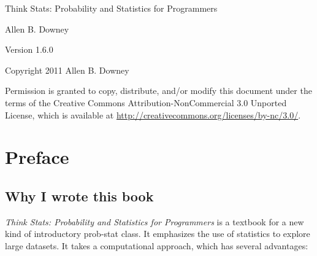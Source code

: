 \documentclass[12pt]{book}
\newcommand{\thetitle}{Think Stats: Probability and Statistics for Programmers}
\newcommand{\theversion}{1.6.0}
\begin{document}
\begin{htmlonly}


{\Large \thetitle}

{\large Allen B. Downey}

Version \theversion

\vspace{0.25in}

Copyright 2011 Allen B. Downey

\vspace{0.25in}

Permission is granted to copy, distribute, and/or modify this document
under the terms of the Creative Commons Attribution-NonCommercial 3.0
Unported License, which is available at
\url{http://creativecommons.org/licenses/by-nc/3.0/}.

\setcounter{chapter}{-1}

\end{htmlonly}

\fi

\chapter{Preface}
\label{preface}

\section*{Why I wrote this book}

{\em Think Stats: Probability and Statistics for Programmers} is a
textbook for a new kind of introductory prob-stat class.  
It emphasizes the use of statistics to explore large datasets.  It
takes a computational approach, which has several advantages:
\end{document}

